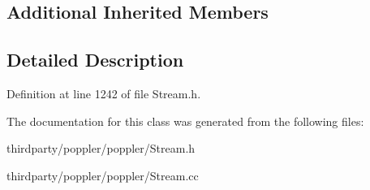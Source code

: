\subsection*{Additional Inherited Members}


\subsection{Detailed Description}


Definition at line 1242 of file Stream.\+h.



The documentation for this class was generated from the following files\+:\begin{DoxyCompactItemize}
\item 
thirdparty/poppler/poppler/Stream.\+h\item 
thirdparty/poppler/poppler/Stream.\+cc\end{DoxyCompactItemize}
